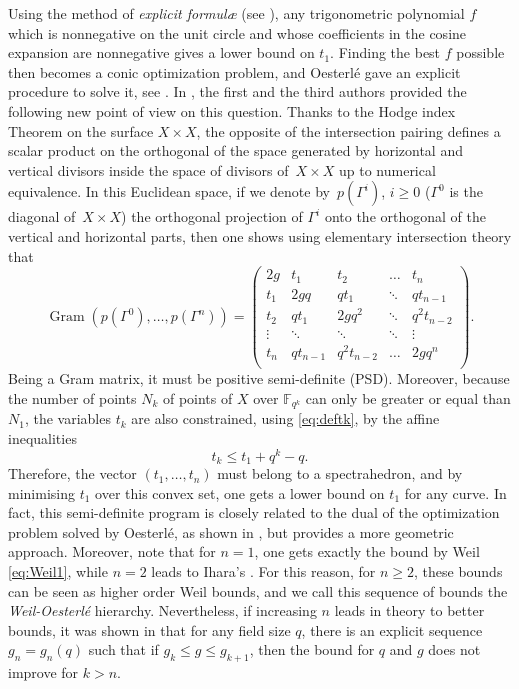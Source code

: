 \documentclass{amsart}
\newcommand{\F}{\mathbb{F}}
\DeclareMathOperator{\Gram}{Gram}
\begin{document}
Using the method of \emph{explicit formul\ae} (see \cite[Chapter V.3]{SerreRP}), any trigonometric polynomial $f$ which is nonnegative on the unit circle and whose coefficients in the cosine expansion are nonnegative gives a lower bound on $t_1$. 
Finding the best $f$ possible then becomes a conic optimization problem, and Oesterl\'e gave an explicit procedure to solve it, see \cite[Chapter VI]{SerreRP}.
In \cite{HP19}, the first and the third authors provided the following new point of view on this question.
Thanks to the Hodge index Theorem on the surface $X \times X$, the opposite of the intersection pairing defines a scalar product on the orthogonal of the space generated by horizontal and vertical divisors inside the space of divisors of~$X\times X$ up to numerical equivalence.
In this Euclidean space, if we denote by~$p(\Gamma^i)$, $i\geq 0$ ($\Gamma^0$ is the diagonal of~$X\times X$) the orthogonal projection of $\Gamma^i$ onto the orthogonal of the vertical and horizontal
parts, then one shows using elementary intersection theory that
\begin{equation}\label{eq:Toep}
\Gram\left(p(\Gamma^0),\ldots,p(\Gamma^n)\right)
=
\begin{pmatrix}
2g & t_1 & t_2 & \ldots  & t_n \\
t_1 & 2gq & qt_1 & \ddots  & qt_{n-1} \\
t_2 & qt_1 & 2gq^2 & \ddots  & q^2t_{n-2} \\
\vdots & \ddots & \ddots & \ddots  & \vdots \\
t_n & qt_{n-1} & q^2t_{n-2} & \ldots  & 2gq^n \\
\end{pmatrix}.
\end{equation}
Being a Gram matrix, it must be positive semi-definite (PSD). 
Moreover, because the number of points $N_k$ of points of $X$ over $\F_{q^k}$ can only be greater or equal than $N_1$, the variables $t_k$ are also constrained, using \eqref{eq:deftk}, by the affine inequalities
\begin{equation}\label{eq:tk}
 t_k \leq t_1 + q^k -q.
\end{equation} 
Therefore, the vector $(t_1, \ldots, t_n)$ must belong to a spectrahedron, and by minimising $t_1$ over this convex set, one gets a lower bound on $t_1$ for any curve. 
In fact, this semi-definite program is closely related to the dual of the optimization problem solved by Oesterl\'e, as shown in \cite{HP19}, but provides a more geometric approach. 
Moreover, note that for $n=1$, one gets exactly the bound by Weil \eqref{eq:Weil1}, while $n=2$ leads to Ihara's
\cite{Ihara}. 
For this reason, for $n \geq 2$, these bounds can be seen as higher order Weil bounds, and we call this sequence of bounds the \textit{Weil-Oesterl\'e} hierarchy.
Nevertheless, if increasing $n$ leads in theory to better bounds, it was shown in \cite{HP19} that for any field size $q$, there is an explicit sequence $g_n = g_n(q)$ such that if $g_k \leq g \leq g_{k+1}$, then the bound for $q$ and $g$ does not improve for $k > n$.
\end{document}
